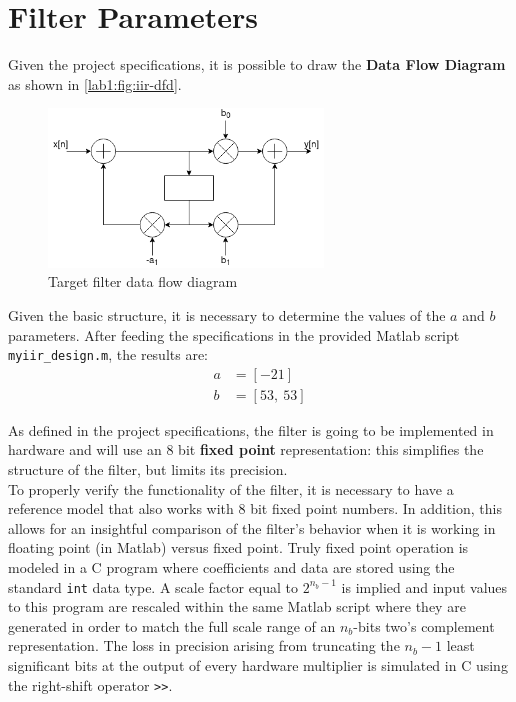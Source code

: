 \section{Filter Parameters}
Given the project specifications, it is possible to draw the \textbf{Data Flow Diagram} as shown in \autoref{lab1:fig:iir-dfd}.
\begin{figure}[htbp]
	\center
	\includegraphics[width=0.65\textwidth]{chapter1/images/iir-dfd.png}
	\caption{Target filter data flow diagram}
	\label{lab1:fig:iir-dfd}
\end{figure}

Given the basic structure, it is necessary to determine the values of the $a$ and $b$ parameters. After feeding the specifications in the provided Matlab script \texttt{myiir\_design.m}, the results are:
\begin{align}
    a &= [-21] \\
    b &= [53,\ 53]
\end{align}


As defined in the project specifications, the filter is going to be implemented in hardware and will use an 8 bit \textbf{fixed point} representation: this simplifies the structure of the filter, but limits its precision.\\
To properly verify the functionality of the filter, it is necessary to have a reference model that also works with 8 bit fixed point numbers. In addition, this allows for an insightful comparison of the filter's behavior when it is working in floating point (in Matlab) versus fixed point.
Truly fixed point operation is modeled in a C program where coefficients and data are stored using the standard \texttt{int} data type. A scale factor equal to $2^{n_b-1}$ is implied and input values to this program are rescaled within the same Matlab script where they are generated in order to match the full scale range of an $n_b$-bits two's complement representation.  The loss in precision arising from truncating the $n_b-1$ least significant bits at the output of every hardware multiplier is simulated in C using the right-shift operator \texttt{>>}.

